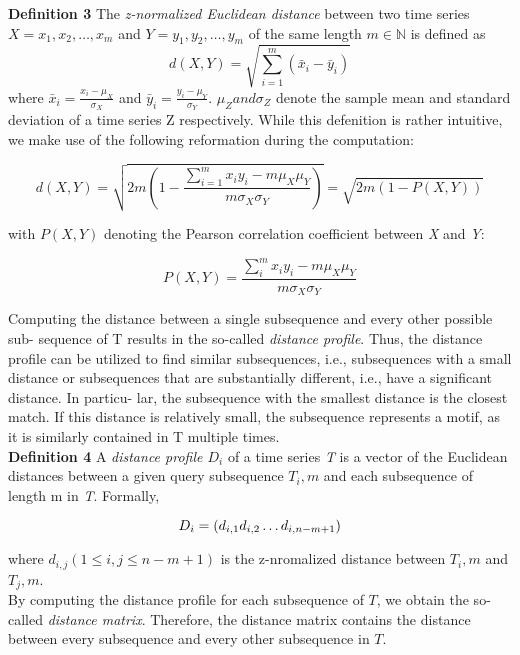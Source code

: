 \textbf{Definition 3} The \textit{z-normalized Euclidean distance} between two time series\\
$X = x_1, x_2, \ldots, x_m$ and $Y = y_1, y_2, \ldots, y_m$ of the same length $m \in \mathbb{N}$ is defined as
\[
    d(X, Y) = \sqrt{\sum_{i=1}^{m} \left(\bar{x}_i - \bar{y}_i \right)}
\]
where \( \bar{x}_i = \frac{x_i -  \mu_X}{\sigma_X} \) and \( \bar{y}_i = \frac{y_i -  \mu_Y}{\sigma_Y} \).
\( \mu_Z and \sigma_Z \) denote the sample mean and standard deviation of a time series Z respectively. While this defenition is rather intuitive, we make use of the following reformation during the computation:

\begin{equation}
    d(X, Y) = \sqrt{2m\left(1 - \frac{\sum_{i=1}^{m}{x_iy_i - m\mu_X\mu_Y}}{m\sigma_X\sigma_Y}\right)} = \sqrt{2m\left(1 - P\left(X, Y\right)\right)}
\end{equation}

with \( P(X, Y) \) denoting the Pearson correlation coefficient between \textit{X} and \textit{Y}:

\begin{equation}
    P(X, Y) = \frac{\sum_{i}^{m}{x_iy_i - m\mu_X\mu_Y}}{m\sigma_X\sigma_Y}
\end{equation}

Computing the distance between a single subsequence and every other possible sub-
sequence of T results in the so-called \textit{distance profile}. Thus, the distance profile can
be utilized to find similar subsequences, i.e., subsequences with a small distance or
subsequences that are substantially different, i.e., have a significant distance. In particu-
lar, the subsequence with the smallest distance is the closest match. If this distance is
relatively small, the subsequence represents a motif, as it is similarly contained in T
multiple times.\\

\textbf{Definition 4} A \textit{distance profile $D_i$} of a time series \textit{T} is a vector of the Euclidean distances between a given query subsequence \textit{$T_i,m$} and each subsequence of length m in \textit{T}.
Formally,

\[
    D_i = \left(d_{i,1} \space d_{i,2} \space \dots \space d_{i,n-m+1}\right)
\]

where \( d_{i,j} \left(1 \le i, j \le n - m + 1\right) \) is the z-nromalized distance between $T_i,m$ and $T_j,m$.\\

By computing the distance profile for each subsequence of $T$, we obtain the so-called \textit{distance matrix}. Therefore, the distance matrix contains the distance between every subsequence and every other subsequence in $T$.\\

